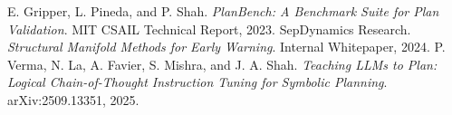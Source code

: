 \documentclass[11pt]{article}
\begin{document}
\begin{thebibliography}{9}
 E. Gripper, L. Pineda, and P. Shah. \emph{PlanBench: A Benchmark Suite for Plan Validation}. MIT CSAIL Technical Report, 2023.
 SepDynamics Research. \emph{Structural Manifold Methods for Early Warning}. Internal Whitepaper, 2024.
 P. Verma, N. La, A. Favier, S. Mishra, and J. A. Shah. \emph{Teaching LLMs to Plan: Logical Chain-of-Thought Instruction Tuning for Symbolic Planning}. arXiv:2509.13351, 2025.
\end{thebibliography}
\end{document}
